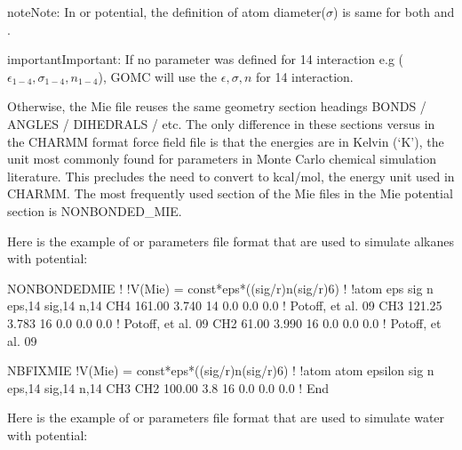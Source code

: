 \documentclass[letterpaper,10pt,english]{sphinxmanual}
\begin{document}
\begin{sphinxadmonition}{note}{Note:}
\sphinxAtStartPar
In  or  potential, the definition of atom diameter(\(\sigma\)) is same for both  and .
\end{sphinxadmonition}

\begin{sphinxadmonition}{important}{Important:}
\sphinxAtStartPar
If no parameter was defined for 1\sphinxhyphen{}4 interaction e.g (\(\epsilon_{1-4}, \sigma_{1-4}, n_{1-4}\)), GOMC will use the  \(\epsilon, \sigma, n\) for 1\sphinxhyphen{}4 interaction.
\end{sphinxadmonition}

\sphinxAtStartPar
Otherwise, the Mie file reuses the same geometry section headings \sphinxhyphen{} BONDS / ANGLES / DIHEDRALS / etc. The only difference in these sections versus in the CHARMM format force field file is that the energies are in Kelvin (‘K’),
the unit most commonly found for parameters in Monte Carlo chemical simulation literature. This precludes the need to convert to kcal/mol, the energy unit used in CHARMM.
The most frequently used section of the Mie files in the Mie potential section is NONBONDED\_MIE.

\sphinxAtStartPar
Here is the example of  or  parameters file format that are used to simulate alkanes with  potential:

\begin{sphinxVerbatim}[commandchars=\\\{\}]
NONBONDED\PYGZus{}MIE
!
!V(Mie) = const*eps*((sig/r)\PYGZca{}n\PYGZhy{}(sig/r)\PYGZca{}6)
!
!atom eps       sig     n     eps,1\PYGZhy{}4   sig,1\PYGZhy{}4   n,1\PYGZhy{}4
CH4   161.00    3.740   14    0.0       0.0       0.0 ! Potoff, et al. \PYGZsq{}09
CH3   121.25    3.783   16    0.0       0.0       0.0 ! Potoff, et al. \PYGZsq{}09
CH2    61.00    3.990   16    0.0       0.0       0.0 ! Potoff, et al. \PYGZsq{}09

NBFIX\PYGZus{}MIE
!V(Mie) = const*eps*((sig/r)\PYGZca{}n\PYGZhy{}(sig/r)\PYGZca{}6)
!
!atom atom  epsilon  sig     n     eps,1\PYGZhy{}4   sig,1\PYGZhy{}4   n,1\PYGZhy{}4
CH3   CH2   100.00   3.8     16    0.0       0.0       0.0 !
End
\end{sphinxVerbatim}

\sphinxAtStartPar
Here is the example of  or  parameters file format that are used to simulate water with  potential:
\end{document}
